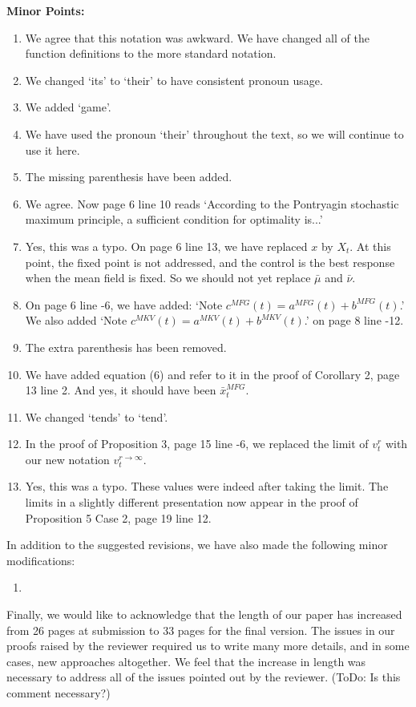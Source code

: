 \documentclass[]{article}
\begin{document}
\hspace{-7mm} \textbf{Minor Points:}
\begin{enumerate}
	\item We agree that this notation was awkward. We have changed all of the function definitions to the more standard notation.
	\item We changed `its' to `their' to have consistent pronoun usage.
	\item We added `game'.
	\item We have used the pronoun `their' throughout the text, so we will continue to use it here.
	\item The missing parenthesis have been added.
	\item We agree. Now page 6 line 10 reads `According to the Pontryagin stochastic maximum principle, a sufficient condition for optimality is...'
	\item Yes, this was a typo. On page 6 line 13, we have replaced $x$ by $X_t$. At this point, the fixed point is not addressed, and the control is the best response when the mean field is fixed. So we should not yet replace $\bar{\mu}$ and $\bar{\nu}$.
	\item On page 6 line -6, we have added: `Note $c^{MFG}(t)=a^{MFG}(t)+b^{MFG}(t)$.' We also added `Note $c^{MKV}(t)=a^{MKV}(t)+b^{MKV}(t)$.' on page 8 line -12.
	\item The extra parenthesis has been removed.
	\item We have added equation (6) and refer to it in the proof of Corollary 2, page 13 line 2. And yes, it should have been $\bar{x}_t^{MFG}$.
	\item We changed `tends' to `tend'.
	\item In the proof of Proposition 3, page 15 line -6, we replaced the limit of $v^r_t$ with our new notation $v^{r \to \infty}_t$.
	\item Yes, this was a typo. These values were indeed after taking the limit. The limits in a slightly different presentation now appear in the proof of Proposition 5 Case 2, page 19 line 12.
\end{enumerate}

\hspace{-7mm} In addition to the suggested revisions, we have also made the following minor modifications:
\begin{enumerate}
	\item 
\end{enumerate}

Finally, we would like to acknowledge that the length of our paper has increased from 26 pages at submission to 33 pages for the final version. The issues in our proofs raised by the reviewer required us to write many more details, and in some cases, new approaches altogether. We feel that the increase in length was necessary to address all of the issues pointed out by the reviewer. (ToDo: Is this comment necessary?)
\end{document}
